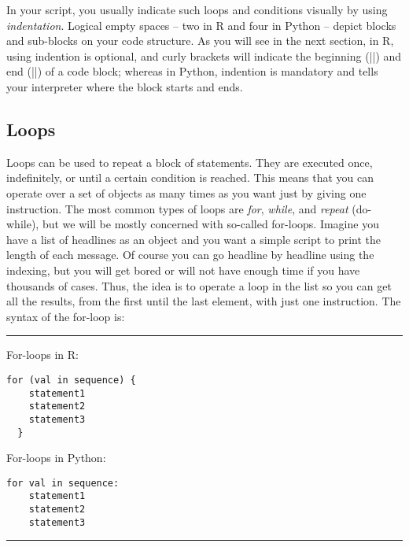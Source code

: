 In your script, you usually indicate such loops and conditions
visually by using \emph{indentation}. Logical empty spaces -- two in R and four in
Python -- depict blocks and sub-blocks on your code structure.
As you will see in the next section, in R, using indention
is optional, and curly brackets will indicate the beginning (|{|)
and end (|}|) of a code block; whereas in Python, indention
is mandatory and tells your interpreter where the block
starts and ends.





\subsection{Loops}
\label{sec:loops}
Loops can be used to repeat a block of statements.
They are executed once, indefinitely, or
until a certain condition is reached. This means that you can operate
over a set of objects as many times as you want just by giving one
instruction. The most common types of loops are \emph{for},
\emph{while}, and \emph{repeat} (do-while), but we will be mostly
concerned with so-called for-loops. Imagine you have a list of
headlines as an object and you want a simple script
to print the length of each message. Of course you can go headline
by headline using the indexing, but you will get bored or will not
have  enough time if you have thousands of cases. Thus, the idea is to
operate a loop in the list so you can get all the results, from the
first until the last element, with just one instruction.  The syntax
of the for-loop is:

\noindent\rule{\textwidth}{.5pt}\vspace{-1em}

\noindent\begin{minipage}[t]{.45\textwidth}
  For-loops in R:
\begin{verbatim}
for (val in sequence) {
    statement1
    statement2
    statement3
  }
\end{verbatim}
\end{minipage}
\begin{minipage}[t]{.45\textwidth}
  For-loops in Python:
\begin{verbatim}
for val in sequence:
    statement1
    statement2
    statement3
\end{verbatim}
\end{minipage}
\vspace{.5em}

\noindent\rule{\textwidth}{.5pt}

